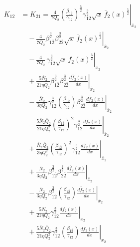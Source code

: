 \documentclass[preprint,12pt]{elsarticle}
\begin{document}
\begin{equation}
\begin{split}
K_{12} &= K_{21} =
\left.\frac{4}{7 Q_2}
\left(\frac{\beta_{1\overline{2}}}{\gamma_{12}}\right)^{\frac{5}{2}}
\gamma_{12}^{\frac{3}{2}} \sqrt{x}\,\overline{f}_{2}(x)^{\frac{5}{2}}
\right|_{\overline{x}_{2}} \\
&\quad
- \left.
\frac{4}{7 \overline{Q}_{2}}
\beta_{1\overline{2}}^{\frac{3}{2}}
\beta_{2\overline{2}}^{\frac{3}{2}}
\sqrt{x}\,\overline{f}_{2}(x)^{\frac{5}{2}}
\right|_{\overline{x}_{2}} \\
&\quad
- \left.
\frac{4}{7 Q_2}\,
\gamma_{12}^{\frac{3}{2}}
\sqrt{x}\,f_2(x)^{\frac{5}{2}}
\right|_{x_2} \\
&\quad
+ \left.
\frac{5 \overline{N}_{2}}{21 \eta \overline{Q}_{2}}
\beta_{1\overline{2}}^{\frac{3}{2}}
\beta_{2\overline{2}}^{\frac{3}{2}}
\frac{d\overline{f}_{2}(x)}{dx}
\right|_{\overline{x}_{2}} \\
&\quad
- \left.
\frac{\overline{N}_{2}}{3 \eta Q_2}
\gamma_{12}^{\frac{3}{2}}
\left(\frac{\beta_{1\overline{2}}}{\gamma_{12}}\right)
\beta_{2\overline{2}}^{\frac{3}{2}}
\frac{d\overline{f}_{2}(x)}{dx}
\right|_{\overline{x}_{2}} \\
&\quad
- \left.
\frac{5 \overline{N}_{2} \overline{Q}_{2}}{21 \eta Q_2^{2}}
\left(\frac{\beta_{1\overline{2}}}{\gamma_{12}}\right)^{2}
\gamma_{12}^{\frac{3}{2}}
\frac{d\overline{f}_{2}(x)}{dx}
\right|_{\overline{x}_{2}} \\
&\quad
+ \left.
\frac{\overline{N}_{2} \overline{Q}_{2}}{3 \eta Q_2^{2}}
\left(\frac{\beta_{1\overline{2}}}{\gamma_{12}}\right)^{2}
\gamma_{12}^{\frac{3}{2}}
\frac{d\overline{f}_{2}(x)}{dx}
\right|_{\overline{x}_{2}} \\
&\quad
+ \left.
\frac{\overline{N}_{2}}{3 \eta \overline{Q}_{2}}
\beta_{1\overline{2}}^{\frac{3}{2}}
\beta_{2\overline{2}}^{\frac{3}{2}}
\frac{d\overline{f}_{2}(x)}{dx}
\right|_{\overline{x}_{2}} \\
&\quad
- \left.
\frac{\overline{N}_{2}}{3 \eta Q_2}
\beta_{1\overline{2}}^{\frac{3}{2}}
\left(\frac{\beta_{1\overline{2}}}{\gamma_{12}}\right)
\frac{d\overline{f}_{2}(x)}{dx}
\right|_{\overline{x}_{2}} \\
&\quad
+ \left.
\frac{5 N_2}{21 \eta Q_2}
\gamma_{12}^{\frac{3}{2}}
\frac{d f_2(x)}{dx}
\right|_{x_2} \\
&\quad
+ \left.
\frac{5 \overline{N}_{2} \overline{Q}_{2}}{21 \eta Q_2^{2}}
\gamma_{12}^{\frac{3}{2}}
\left(\frac{\beta_{1\overline{2}}}{\gamma_{12}}\right)
\frac{d f_2(x)}{dx}
\right|_{x_2} \\

\end{split}
\end{equation}
\end{document}
